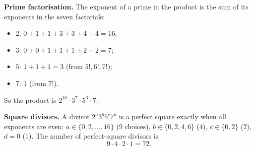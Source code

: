 \textbf{Prime factorisation.} The exponent of a prime in the product is the sum of its exponents in the seven factorials:
\begin{itemize}
\item $2$: $0+1+1+3+3+4+4=16$;
\item $3$: $0+0+1+1+1+2+2=7$;
\item $5$: $1+1+1=3$ (from $5!,6!,7!$);
\item $7$: $1$ (from $7!$).
\end{itemize}
So the product is $2^{16}\cdot3^7\cdot5^3\cdot7$.

\textbf{Square divisors.} A divisor $2^a3^b5^c7^d$ is a perfect square exactly when all exponents are even: $a\in\{0,2,\dots,16\}$ ($9$ choices), $b\in\{0,2,4,6\}$ ($4$), $c\in\{0,2\}$ ($2$), $d=0$ ($1$). The number of perfect-square divisors is
\[
9\cdot4\cdot2\cdot1=\boxed{72}.
\]
